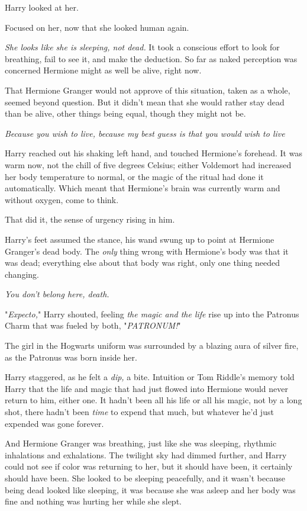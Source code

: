 Harry looked at her.

Focused on her, now that she looked human again.

\emph{She looks like she is sleeping, not dead.} It took a conscious effort to
look for breathing, fail to see it, and make the deduction. So far as naked
perception was concerned{\el} Hermione might as well be alive, right now.

That Hermione Granger would not approve of this situation, taken as a whole,
seemed beyond question. But it didn't mean that she would rather stay dead than
be alive, other things being equal, though they might not be.

\emph{Because you wish to live, because my best guess is that you would wish to
live{\el}}

Harry reached out his shaking left hand, and touched Hermione's forehead. It
was warm now, not the chill of five degrees Celsius; either Voldemort had
increased her body temperature to normal, or the magic of the ritual had done
it automatically. Which meant that Hermione's brain was currently warm and
without oxygen, come to think.

That did it, the sense of urgency rising in him.

Harry's feet assumed the stance, his wand swung up to point at Hermione
Granger's dead body. The \emph{only} thing wrong with Hermione's body was that
it was dead; everything else about that body was right, only one thing needed
changing.

\emph{You don't belong here, death.}

"\emph{Expecto,}" Harry shouted, feeling \emph{the magic and the life} rise up
into the Patronus Charm that was fueled by both, "\emph{PATRONUM!}"

The girl in the Hogwarts uniform was surrounded by a blazing aura of silver
fire, as the Patronus was born inside her.

Harry staggered, as he felt a \emph{dip,} a bite. Intuition or Tom Riddle's
memory told Harry that the life and magic that had just flowed into Hermione
would never return to him, either one. It hadn't been all his life or all his
magic, not by a long shot, there hadn't been \emph{time} to expend that much,
but whatever he'd just expended was gone forever.

And Hermione Granger was breathing, just like she was sleeping, rhythmic
inhalations and exhalations. The twilight sky had dimmed further, and Harry
could not see if color was returning to her, but it should have been, it
certainly should have been. She looked to be sleeping peacefully, and it wasn't
because being dead looked like sleeping, it was because she was asleep and her
body was fine and nothing was hurting her while she slept.

